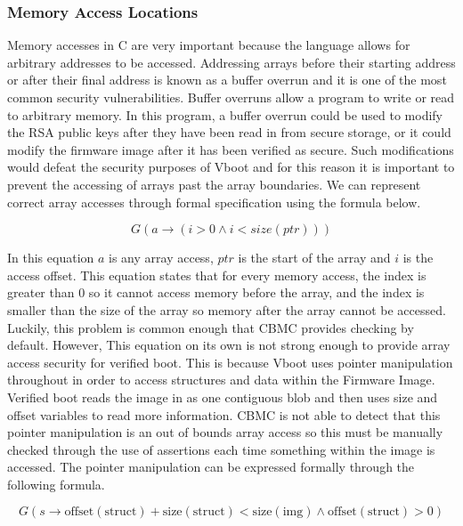 \documentclass[../report.tex]{subfiles}
\begin{document}
\subsubsection{Memory Access Locations}

Memory accesses in C are very important because the language allows for arbitrary addresses to be accessed. 
Addressing arrays before their starting address or after their final address is known as a buffer overrun and it is one of the most common security vulnerabilities. 
Buffer overruns allow a program to write or read to arbitrary memory. 
In this program, a buffer overrun could be used to modify the RSA public keys after they have been read in from secure storage, or it could modify the firmware image after it has been verified as secure. 
Such modifications would defeat the security purposes of Vboot and for this reason it is important to prevent the accessing of arrays past the array boundaries.
We can represent correct array accesses through formal specification using the formula below.

\begin{equation}
    G(a \to (i > 0 \land i < size(ptr)))
\end{equation}

In this equation $a$ is any array access, $ptr$ is the start of the array and $i$ is the access offset.
This equation states that for every memory access, the index is greater than 0 so it cannot access memory before the array,  and the index is smaller than the size of the array so memory after the array cannot be accessed.
Luckily, this problem is common enough that CBMC provides checking by default.
However, This equation on its own is not strong enough to provide array access security for verified boot. 
This is because Vboot uses pointer manipulation throughout in order to access structures and data within the Firmware Image. 
Verified boot reads the image in as one contiguous blob and then uses size and offset variables to read more information.
CBMC is not able to detect that this pointer manipulation is an out of bounds array access so this must be manually checked through the use of assertions each time something within the image is accessed.
The pointer manipulation can be expressed formally through the following formula.

\begin{equation}
    G(s \to \text{offset}(\text{struct}) + \text{size}(\text{struct}) <
    \text{size}(\text{img}) \land \text{offset}(\text{struct}) > 0)
\end{equation}
\end{document}
